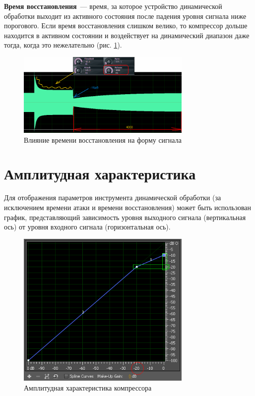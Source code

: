 \documentclass[oneside, final, 14pt]{extreport}
\begin{document}
\textbf{Время восстановления}~--- время, за которое устройство динамической обработки выходит из активного состояния после падения уровня сигнала ниже порогового. Если время восстановления слишком велико, то компрессор дольше находится в активном состоянии и воздействует на динамический диапазон даже тогда, когда это нежелательно (рис. \ref{pic-compress-06}).

\begin{figure}[h!]
  \centering
  \includegraphics[width=0.75\textwidth]{pic-compress-06}
  \caption{Влияние времени восстановления на форму сигнала}
  \label{pic-compress-06}
\end{figure}

\section{Амплитудная характеристика}
Для отображения параметров инструмента динамической обработки (за исключением времени атаки и времени восстановления) может быть использован график, представляющий зависимость уровня выходного сигнала (вертикальная ось) от уровня входного сигнала (горизонтальная ось).

\begin{figure}[h!]
  \centering
  \includegraphics[width=0.75\textwidth]{pic-amp-01}
  \caption{Амплитудная характеристика компрессора}
  \label{pic-amp-01}
\end{figure}
\end{document}
